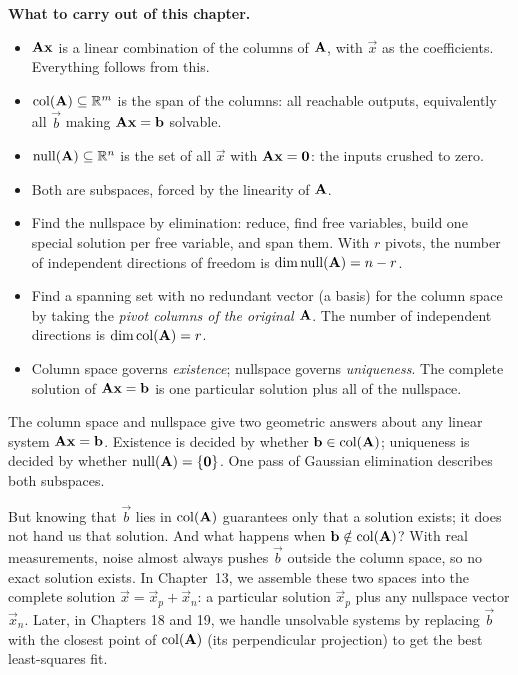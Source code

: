 \begin{focusbox}
\textbf{What to carry out of this chapter.}
\begin{itemize}
  \item $\mathbf{A}\mathbf{x}$ is a linear combination of the columns of $\mathbf{A}$, with
  $\vec{x}$ as the coefficients. Everything follows from this.
  \item $\operatorname{col}(\mathbf{A})\subseteq\mathbb{R}^m$ is the span of the columns: all reachable
  outputs, equivalently all $\vec{b}$ making $\mathbf{A}\mathbf{x}=\mathbf{b}$ solvable.
  \item $\operatorname{null}(\mathbf{A})\subseteq\mathbb{R}^n$ is the set of all $\vec{x}$ with
  $\mathbf{A}\mathbf{x}=\mathbf{0}$: the inputs crushed to zero.
  \item Both are subspaces, forced by the linearity of $\mathbf{A}$.
  \item Find the nullspace by elimination: reduce, find free variables, build one
  special solution per free variable, and span them. With $r$ pivots, the number of independent directions of freedom is $\dim\operatorname{null}(\mathbf{A}) = n - r$.
  \item Find a spanning set with no redundant vector (a basis) for the column space by taking the \emph{pivot columns of the
  original $\mathbf{A}$}. The number of independent directions is $\dim\operatorname{col}(\mathbf{A}) = r$.
  \item Column space governs \emph{existence}; nullspace governs \emph{uniqueness}.
  The complete solution of $\mathbf{A}\mathbf{x}=\mathbf{b}$ is one particular solution
  plus all of the nullspace.
\end{itemize}
\end{focusbox}

\begin{connectionbox}
The column space and nullspace give two geometric answers about any linear system $\mathbf{A}\mathbf{x}=\mathbf{b}$. Existence is decided by whether $\mathbf{b} \in \operatorname{col}(\mathbf{A})$; uniqueness is decided by whether $\operatorname{null}(\mathbf{A}) = \{\mathbf{0}\}$. One pass of Gaussian elimination describes both subspaces.

But knowing that $\vec{b}$ lies in $\operatorname{col}(\mathbf{A})$ guarantees only that a solution exists; it does not hand us that solution. And what happens when $\mathbf{b} \notin \operatorname{col}(\mathbf{A})$? With real measurements, noise almost always pushes $\vec{b}$ outside the column space, so no exact solution exists. In Chapter~13, we assemble these two spaces into the complete solution $\vec{x} = \vec{x}_p + \vec{x}_n$: a particular solution $\vec{x}_p$ plus any nullspace vector $\vec{x}_n$. Later, in Chapters 18 and 19, we handle unsolvable systems by replacing $\vec{b}$ with the closest point of $\operatorname{col}(\mathbf{A})$ (its perpendicular projection) to get the best least-squares fit.
\end{connectionbox}

